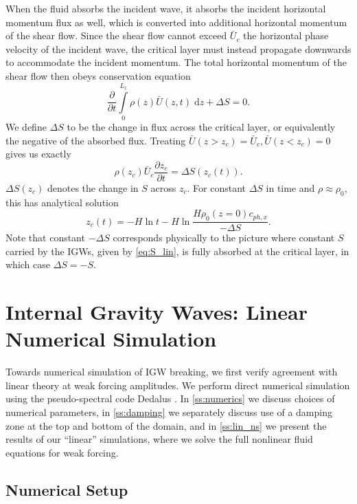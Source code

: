 \documentclass[
        fleqn,
        usenatbib,
    ]{mnras}
\newcommand*{\pd}[2]{\frac{\partial#1}{\partial#2}}
\begin{document}
When the fluid absorbs the incident wave, it absorbs the incident horizontal
momentum flux as well, which is converted into additional horizontal momentum of
the shear flow. Since the shear flow cannot exceed $\bar{U}_c$ the horizontal
phase velocity of the incident wave, the critical layer must instead propagate
downwards to accommodate the incident momentum. The total horizontal momentum of
the shear flow then obeys conservation equation
\begin{equation}
    \pd{}{t}\int\limits_0^{L_z} \rho(z) \bar{U}(z, t)\;\mathrm{d}z
        + \Delta S = 0.
\end{equation}
We define $\Delta S$ to be the change in flux across the critical layer, or
equivalently the negative of the absorbed flux. Treating $\bar{U}(z > z_c) =
\bar{U}_c, \bar{U}(z < z_c) = 0$ gives us exactly
\begin{equation}
    \rho(z_c) \bar{U}_c\pd{z_c}{t} = \Delta S(z_c(t)).\label{eq:zc_anal}
\end{equation}
$\Delta S(z_c)$ denotes the change in $S$ across $z_c$. For constant $\Delta S$
in time and $\rho \approx \rho_0$, this has analytical solution
\begin{equation}
    z_c(t) = -H\ln t - H\ln \frac{H\rho_0(z = 0)c_{ph, x}}{-\Delta S}
        .\label{eq:zc_sol}
\end{equation}
Note that constant $-\Delta S$ corresponds physically to the picture where
constant $S$ carried by the IGWs, given by \autoref{eq:S_lin}, is fully absorbed
at the critical layer, in which case $\Delta S = -S$.

\section{Internal Gravity Waves: Linear Numerical Simulation}\label{s:sim}

Towards numerical simulation of IGW breaking, we first verify agreement with
linear theory at weak forcing amplitudes. We perform direct numerical simulation
using the pseudo-spectral code Dedalus \citep{dedalus}. In \autoref{ss:numerics}
we discuss choices of numerical parameters, in \autoref{ss:damping} we
separately discuss use of a damping zone at the top and bottom of the domain,
and in \autoref{ss:lin_ns} we present the results of our ``linear'' simulations,
where we solve the full nonlinear fluid equations for weak forcing.

\subsection{Numerical Setup}\label{ss:numerics}
\end{document}
